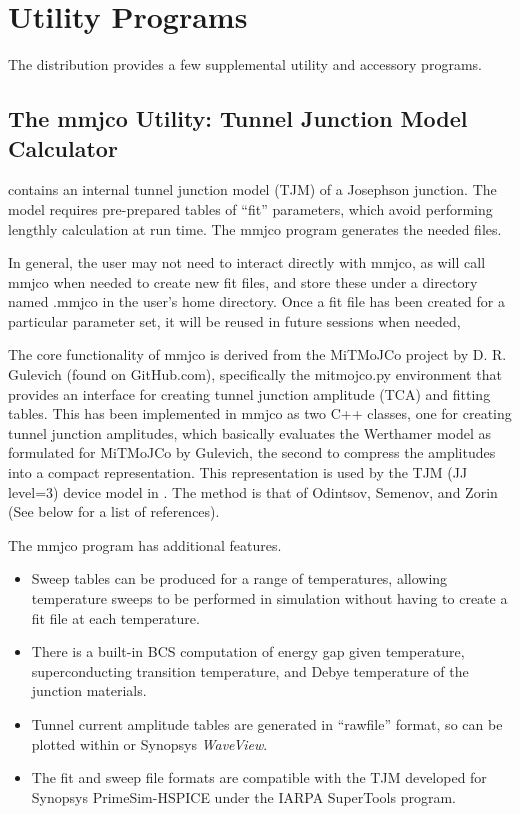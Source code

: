 
\chapter{Utility Programs}


The {\WRspice} distribution provides a few supplemental utility
and accessory programs.

\section{The {\vt mmjco} Utility: Tunnel Junction Model Calculator}
\label{mmjco}


{\WRspice} contains an internal tunnel junction model (TJM) of a
Josephson junction.  The model requires pre-prepared tables of ``fit''
parameters, which avoid performing lengthly calculation at run time. 
The {\vt mmjco} program generates the needed files.

In general, the user may not need to interact directly with {\vt
mmjco}, as {\WRspice} will call {\vt mmjco} when needed to create new
fit files, and store these under a directory named {\vt .mmjco} in the
user's home directory.  Once a fit file has been created for a
particular parameter set, it will be reused in future {\WRspice}
sessions when needed,

The core functionality of {\vt mmjco} is derived from the MiTMoJCo
project by D.  R.  Gulevich (found on GitHub.com), specifically the
{\vt mitmojco.py} environment that provides an interface for creating
tunnel junction amplitude (TCA) and fitting tables.  This has been
implemented in {\vt mmjco} as two C++ classes, one for creating tunnel
junction amplitudes, which basically evaluates the Werthamer model as
formulated for MiTMoJCo by Gulevich, the second to compress the
amplitudes into a compact representation.  This representation is used
by the TJM (JJ level=3) device model in {\WRspice}.  The method is
that of Odintsov, Semenov, and Zorin (See below for a list of
references).

The {\vt mmjco} program has additional features.
\begin{itemize}
\item{Sweep tables can be produced for a range of temperatures,
allowing temperature sweeps to be performed in simulation without
having to create a fit file at each temperature.}
\item{There is a built-in BCS computation of energy gap given
temperature, superconducting transition temperature, and Debye
temperature of the junction materials.}
\item{Tunnel current amplitude tables are generated in ``rawfile''
format, so can be plotted within {\WRspice} or Synopsys
{\it WaveView}.}
\item{The fit and sweep file formats are compatible with the TJM
developed for Synopsys PrimeSim-HSPICE under the IARPA SuperTools
program.}
\end{itemize}

